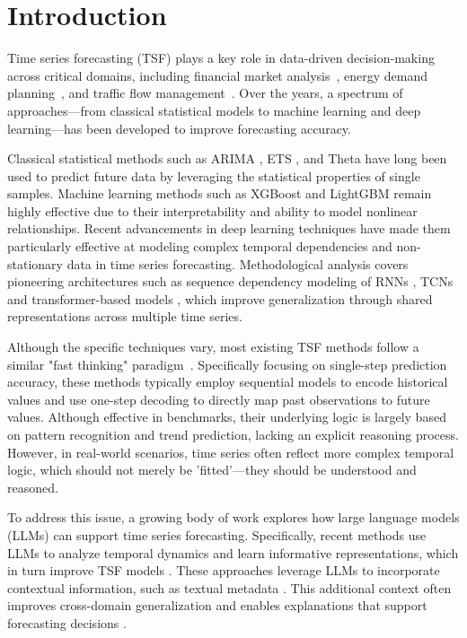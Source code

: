 
\section{Introduction}

Time series forecasting (TSF) plays a key role in data-driven decision-making across critical domains, including financial market analysis~\cite{sako2022neural}, energy demand planning~\cite{kotzur2018time}, and traffic flow management~\cite{li2015trend}. Over the years, a spectrum of approaches—from classical statistical models to machine learning and deep learning—has been developed to improve forecasting accuracy.

Classical statistical methods such as ARIMA \citep{zhang2003time}, ETS \citep{hyndman2008forecasting}, and Theta \citep{assimakopoulos2000theta} have long been used to predict future data by leveraging the statistical properties of single samples. Machine learning methods such as XGBoost\citep{chen2016xgboost} and LightGBM\citep{ke2017lightgbm} remain highly effective due to their interpretability and ability to model nonlinear relationships. Recent advancements in deep learning techniques have made them particularly effective at modeling complex temporal dependencies and non-stationary data in time series forecasting. Methodological analysis covers pioneering architectures such as sequence dependency modeling of RNNs \citep{hewamalage2021recurrent,salinas2020deepar}, TCNs \citep{hewage2020temporal} and transformer-based models \citep{ijcai2023p759}, which improve generalization through shared representations across multiple time series.



Although the specific techniques vary, most existing TSF methods follow a similar "fast thinking" paradigm~\citep{wang2024tabletime,wang2025can,liu2025evaluating}. Specifically focusing on single-step prediction accuracy, these methods typically employ sequential models to encode historical values and use one-step decoding to directly map past observations to future values. Although effective in benchmarks, their underlying logic is largely based on pattern recognition and trend prediction, lacking an explicit reasoning process. However, in real-world scenarios, time series often reflect more complex temporal logic, which should not merely be 'fitted'—they should be understood and reasoned.


To address this issue, a growing body of work explores how large language models (LLMs) can support time series forecasting. Specifically, recent methods use LLMs to analyze temporal dynamics and learn informative representations, which in turn improve TSF models \citep{chang2023llm4ts,liu2025calf,jin2023time}. These approaches leverage LLMs to incorporate contextual information, such as textual metadata \citep{gruver2023large}. This additional context often improves cross-domain generalization \citep{liu2024time, dooley2023forecastpfn} and enables explanations that support forecasting decisions \citep{tan2024language}.


